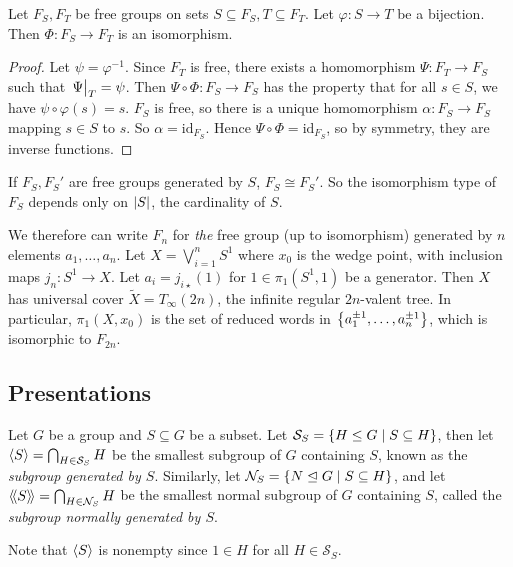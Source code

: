 \begin{lemma}
	Let \( F_S, F_T \) be free groups on sets \( S \subseteq F_S, T \subseteq F_T \).
	Let \( \varphi \colon S \to T \) be a bijection.
	Then \( \Phi \colon F_S \to F_T \) is an isomorphism.
\end{lemma}
\begin{proof}
	Let \( \psi = \varphi^{-1} \).
	Since \( F_T \) is free, there exists a homomorphism \( \Psi \colon F_T \to F_S \) such that \( \eval{\Psi}_T = \psi \).
	Then \( \Psi \circ \Phi \colon F_S \to F_S \) has the property that for all \( s \in S \), we have \( \psi \circ \varphi(s) = s \).
	\( F_S \) is free, so there is a unique homomorphism \( \alpha \colon F_S \to F_S \) mapping \( s \in S \) to \( s \).
	So \( \alpha = \mathrm{id}_{F_S} \).
	Hence \( \Psi \circ \Phi = \mathrm{id}_{F_S} \), so by symmetry, they are inverse functions.
\end{proof}
\begin{corollary}
	If \( F_S, F_S' \) are free groups generated by \( S \), \( F_S \cong F_S' \).
	So the isomorphism type of \( F_S \) depends only on \( \abs{S} \), the cardinality of \( S \).
\end{corollary}
We therefore can write \( F_n \) for \emph{the} free group (up to isomorphism) generated by \( n \) elements \( a_1, \dots, a_n \).
Let \( X = \bigvee_{i=1}^n S^1 \) where \( x_0 \) is the wedge point, with inclusion maps \( j_n \colon S^1 \to X \).
Let \( a_i = j_{i\star}(1) \) for \( 1 \in \pi_1(S^1,1) \) be a generator.
Then \( X \) has universal cover \( \widetilde X = T_\infty(2n) \), the infinite regular \( 2n \)-valent tree.
In particular, \( \pi_1(X,x_0) \) is the set of reduced words in \( \qty{a_1^{\pm 1}, \dots, a_n^{\pm 1}} \), which is isomorphic to \( F_{2n} \).

\subsection{Presentations}
\begin{definition}
	Let \( G \) be a group and \( S \subseteq G \) be a subset.
	Let \( \mathcal S_S = \qty{H \leq G \mid S \subseteq H} \), then let \( \left\langle{} S \right\rangle = \bigcap_{H \in \mathcal S_S} H \) be the smallest subgroup of \( G \) containing \( S \), known as the \emph{subgroup generated by \( S \)}.
	Similarly, let \( \mathcal N_S = \qty{N \trianglelefteq G \mid S \subseteq H} \), and let \( \left\langle\!\left\langle{} S \right\rangle\!\right\rangle = \bigcap_{H \in \mathcal N_S} H \) be the smallest normal subgroup of \( G \) containing \( S \), called the \emph{subgroup normally generated by \( S \)}.
\end{definition}
Note that \( \left\langle{} S \right\rangle \) is nonempty since \( 1 \in H \) for all \( H \in \mathcal S_S \).


